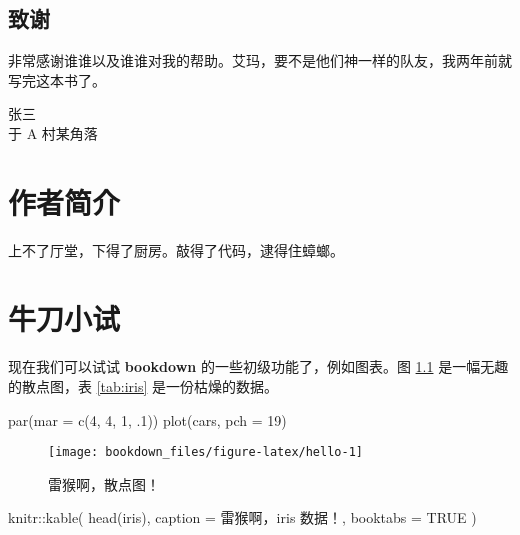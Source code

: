 \documentclass[]{ctexbook}
\newenvironment{Shaded}{\begin{snugshade}}{\end{snugshade}}
\newcommand{\AttributeTok}[1]{\textcolor[rgb]{0.77,0.63,0.00}{#1}}
\newcommand{\ConstantTok}[1]{\textcolor[rgb]{0.00,0.00,0.00}{#1}}
\newcommand{\DecValTok}[1]{\textcolor[rgb]{0.00,0.00,0.81}{#1}}
\newcommand{\FunctionTok}[1]{\textcolor[rgb]{0.00,0.00,0.00}{#1}}
\newcommand{\NormalTok}[1]{#1}
\newcommand{\SpecialCharTok}[1]{\textcolor[rgb]{0.00,0.00,0.00}{#1}}
\newcommand{\StringTok}[1]{\textcolor[rgb]{0.31,0.60,0.02}{#1}}
\begin{document}
\hypertarget{ux81f4ux8c22}{%
\section*{致谢}\label{ux81f4ux8c22}}


非常感谢谁谁以及谁谁对我的帮助。艾玛，要不是他们神一样的队友，我两年前就写完这本书了。

\begin{flushright}
张三\\
于 A 村某角落
\end{flushright}

\hypertarget{author}{%
\chapter*{作者简介}\label{author}}


上不了厅堂，下得了厨房。敲得了代码，逮得住蟑螂。

\mainmatter

\hypertarget{intro}{%
\chapter{牛刀小试}\label{intro}}

现在我们可以试试 \textbf{bookdown} 的一些初级功能了，例如图表。图 \ref{fig:hello} 是一幅无趣的散点图，表 \ref{tab:iris} 是一份枯燥的数据。

\begin{Shaded}
\begin{Highlighting}[]
\FunctionTok{par}\NormalTok{(}\AttributeTok{mar =} \FunctionTok{c}\NormalTok{(}\DecValTok{4}\NormalTok{, }\DecValTok{4}\NormalTok{, }\DecValTok{1}\NormalTok{, .}\DecValTok{1}\NormalTok{))}
\FunctionTok{plot}\NormalTok{(cars, }\AttributeTok{pch =} \DecValTok{19}\NormalTok{)}
\end{Highlighting}
\end{Shaded}

\begin{figure}
\texttt{[image: bookdown\_files/figure-latex/hello-1]} \caption{雷猴啊，散点图！}\label{fig:hello}
\end{figure}

\begin{Shaded}
\begin{Highlighting}[]
\NormalTok{knitr}\SpecialCharTok{::}\FunctionTok{kable}\NormalTok{(}
  \FunctionTok{head}\NormalTok{(iris), }\AttributeTok{caption =} \StringTok{\textquotesingle{}雷猴啊，iris 数据！\textquotesingle{}}\NormalTok{,}
  \AttributeTok{booktabs =} \ConstantTok{TRUE}
\NormalTok{)}
\end{Highlighting}
\end{Shaded}
\end{document}
